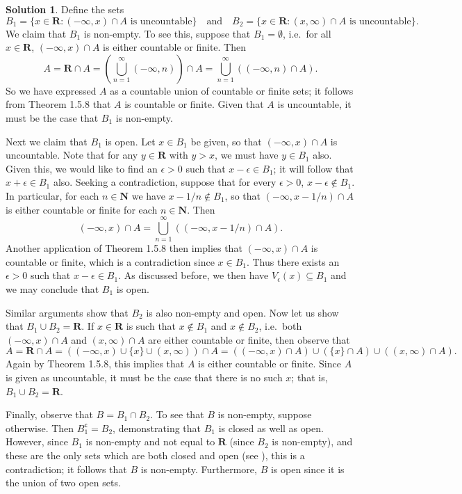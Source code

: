 \documentclass[12pt]{article}
\theoremstyle{definition}
\theoremstyle{exercise}
\theoremstyle{solution}
\newtheorem*{solution}{Solution}
\newcommand{\setcomp}[1]{#1^{\mathsf{c}}}
\newcommand{\quand}{\quad \text{and} \quad}
\newcommand{\N}{\mathbf{N}}
\newcommand{\R}{\mathbf{R}}
\begin{document}
\begin{solution}
    Define the sets
    \[
        B_1 = \{ x \in \R : (-\infty, x) \cap A \text{ is uncountable} \} \quand B_2 = \{ x \in \R : (x, \infty) \cap A \text{ is uncountable} \}.
    \]
    We claim that \( B_1 \) is non-empty. To see this, suppose that \( B_1 = \emptyset \), i.e.\ for all \( x \in \R \), \( (-\infty, x) \cap A \) is either countable or finite. Then
    \[
        A = \R \cap A = \left( \bigcup_{n=1}^{\infty} (-\infty, n) \right) \cap A = \bigcup_{n=1}^{\infty} ((-\infty, n) \cap A).
    \]
    So we have expressed \( A \) as a countable union of countable or finite sets; it follows from Theorem 1.5.8 that \( A \) is countable or finite. Given that \( A \) is uncountable, it must be the case that \( B_1 \) is non-empty.

    Next we claim that \( B_1 \) is open. Let \( x \in B_1 \) be given, so that \( (-\infty, x) \cap A \) is uncountable. Note that for any \( y \in \R \) with \( y > x \), we must have \( y \in B_1 \) also. Given this, we would like to find an \( \epsilon > 0 \) such that \( x - \epsilon \in B_1 \); it will follow that \( x + \epsilon \in B_1 \) also. Seeking a contradiction, suppose that for every \( \epsilon > 0 \), \( x - \epsilon \not\in B_1 \). In particular, for each \( n \in \N \) we have \( x - 1/n \not\in B_1 \), so that \( (-\infty, x - 1/n) \cap A \) is either countable or finite for each \( n \in \N \). Then
    \[
        (-\infty, x) \cap A = \bigcup_{n=1}^{\infty} ((-\infty, x - 1/n) \cap A).
    \]
    Another application of Theorem 1.5.8 then implies that \( (-\infty, x) \cap A \) is countable or finite, which is a contradiction since \( x \in B_1 \). Thus there exists an \( \epsilon > 0 \) such that \( x - \epsilon \in B_1 \). As discussed before, we then have \( V_{\epsilon}(x) \subseteq B_1 \) and we may conclude that \( B_1 \) is open.

    Similar arguments show that \( B_2 \) is also non-empty and open. Now let us show that \( B_1 \cup B_2 = \R \). If \( x \in \R \) is such that \( x \not\in B_1 \) and \( x \not\in B_2 \), i.e.\ both \( (-\infty, x) \cap A \) and \( (x, \infty) \cap A \) are either countable or finite, then observe that
    \[
        A = \R \cap A = ((-\infty, x) \cup \{ x \} \cup (x, \infty)) \cap A = ((-\infty, x) \cap A) \cup (\{ x \} \cap A) \cup ((x, \infty) \cap A).
    \]
    Again by Theorem 1.5.8, this implies that \( A \) is either countable or finite. Since \( A \) is given as uncountable, it must be the case that there is no such \( x \); that is, \( B_1 \cup B_2 = \R \).

    Finally, observe that \( B = B_1 \cap B_2 \). To see that \( B \) is non-empty, suppose otherwise. Then \( \setcomp{B_1} = B_2 \), demonstrating that \( B_1 \) is closed as well as open. However, since \( B_1 \) is non-empty and not equal to \( \R \) (since \( B_2 \) is non-empty), and these are the only sets which are both closed and open (see ), this is a contradiction; it follows that \( B \) is non-empty. Furthermore, \( B \) is open since it is the union of two open sets.
\end{solution}
\end{document}
